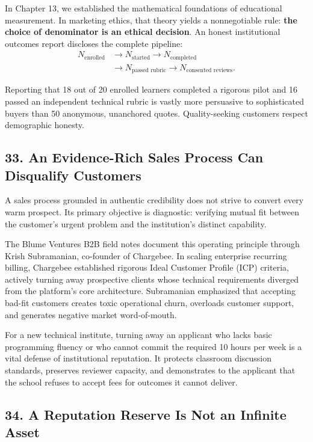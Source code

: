 In Chapter 13, we established the mathematical foundations of educational measurement. In marketing ethics, that theory yields a nonnegotiable rule: \textbf{the choice of denominator is an ethical decision}. An honest institutional outcomes report discloses the complete pipeline:
\begin{equation}
\begin{aligned}
N_{\text{enrolled}} &\longrightarrow N_{\text{started}} \longrightarrow N_{\text{completed}} \\
&\longrightarrow N_{\text{passed rubric}} \longrightarrow N_{\text{consented reviews}}.
\end{aligned}
\end{equation}

Reporting that 18 out of 20 enrolled learners completed a rigorous pilot and 16 passed an independent technical rubric is vastly more persuasive to sophisticated buyers than 50 anonymous, unanchored quotes. Quality-seeking customers respect demographic honesty.

\subsection*{33. An Evidence-Rich Sales Process Can Disqualify Customers}

A sales process grounded in authentic credibility does not strive to convert every warm prospect. Its primary objective is diagnostic: verifying mutual fit between the customer's urgent problem and the institution's distinct capability.

The Blume Ventures B2B field notes document this operating principle through Krish Subramanian, co-founder of Chargebee. In scaling enterprise recurring billing, Chargebee established rigorous Ideal Customer Profile (ICP) criteria, actively turning away prospective clients whose technical requirements diverged from the platform's core architecture. Subramanian emphasized that accepting bad-fit customers creates toxic operational churn, overloads customer support, and generates negative market word-of-mouth.

For a new technical institute, turning away an applicant who lacks basic programming fluency or who cannot commit the required 10 hours per week is a vital defense of institutional reputation. It protects classroom discussion standards, preserves reviewer capacity, and demonstrates to the applicant that the school refuses to accept fees for outcomes it cannot deliver.

\subsection*{34. A Reputation Reserve Is Not an Infinite Asset}


